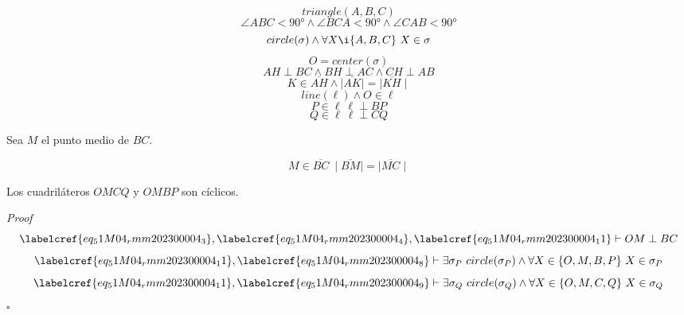 \begin{equation} \label{eq_51M04_rmm202300004_1}
	triangle(A, B, C)
\end{equation}
\begin{equation} \label{eq_51M04_rmm202300004_2}
	\angle{ABC} < \ang{90} \land \angle{BCA} < \ang{90} \land \angle{CAB} < \ang{90}
\end{equation}
\begin{equation} \label{eq_51M04_rmm202300004_3}
	circle(\sigma) \land \forall X \i \{A, B, C\}\ X \in \sigma
\end{equation}
\begin{equation} \label{eq_51M04_rmm202300004_4}
	O = center(\sigma)
\end{equation}
\begin{equation} \label{eq_51M04_rmm202300004_5}
	{AH \perp BC} \land {BH \perp AC} \land {CH \perp AB}
\end{equation}
\begin{equation} \label{eq_51M04_rmm202300004_6}
	K \in \overline{AH} \land \mid\overline{AK}\mid = \mid\overline{KH}\mid
\end{equation}
\begin{equation} \label{eq_51M04_rmm202300004_7}
	line(\ell) \land O \in \ell
\end{equation}
\begin{equation} \label{eq_51M04_rmm202300004_8}
	P \in \ell \ \ell \perp BP
\end{equation}
\begin{equation} \label{eq_51M04_rmm202300004_9}
	Q \in \ell \ \ell \perp CQ
\end{equation}

Sea $M$ el punto medio de $BC$. 

\begin{equation} \label{eq_51M04_rmm202300004_10}
	M \in \overline{BC}\ \mid\overline{BM}\mid = \mid\overline{MC}\mid
\end{equation}

\begin{claim}
	Los cuadriláteros $OMCQ$ y $OMBP$ son cíclicos.
\end{claim}
\textit{Proof}
\begin{equation} \label{eq_51M04_rmm202300004_11}
	\labelcref{eq_51M04_rmm202300004_3}, \labelcref{eq_51M04_rmm202300004_4}, \labelcref{eq_51M04_rmm202300004_11} \vdash OM \perp BC
\end{equation}
\begin{equation} \label{eq_51M04_rmm202300004_12}
	\labelcref{eq_51M04_rmm202300004_11}, \labelcref{eq_51M04_rmm202300004_8} \vdash \exists \sigma_P\ circle(\sigma_P) \land \forall X \in \{O, M, B, P\}\ X \in \sigma_P
\end{equation}
\begin{equation} \label{eq_51M04_rmm202300004_13}
	\labelcref{eq_51M04_rmm202300004_11}, \labelcref{eq_51M04_rmm202300004_9} \vdash \exists \sigma_Q\ circle(\sigma_Q) \land \forall X \in \{O, M, C, Q\}\ X \in \sigma_Q
\end{equation}
\hfill $\square$

